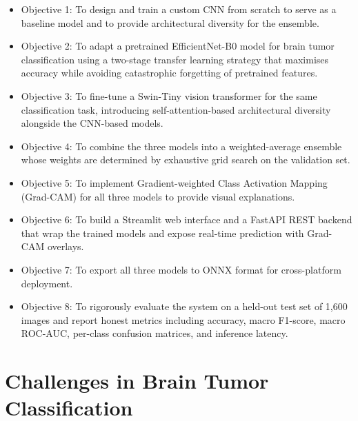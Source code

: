 \documentclass[12pt,a4paper,oneside]{report}
\begin{document}
\begin{itemize}[leftmargin=*]
  \item Objective 1: To design and train a custom CNN from scratch to serve as a baseline model and to provide architectural diversity for the ensemble.
  \item Objective 2: To adapt a pretrained EfficientNet-B0 model for brain tumor classification using a two-stage transfer learning strategy that maximises accuracy while avoiding catastrophic forgetting of pretrained features.
  \item Objective 3: To fine-tune a Swin-Tiny vision transformer for the same classification task, introducing self-attention-based architectural diversity alongside the CNN-based models.
  \item Objective 4: To combine the three models into a weighted-average ensemble whose weights are determined by exhaustive grid search on the validation set.
  \item Objective 5: To implement Gradient-weighted Class Activation Mapping (Grad-CAM) for all three models to provide visual explanations.
  \item Objective 6: To build a Streamlit web interface and a FastAPI REST backend that wrap the trained models and expose real-time prediction with Grad-CAM overlays.
  \item Objective 7: To export all three models to ONNX format for cross-platform deployment.
  \item Objective 8: To rigorously evaluate the system on a held-out test set of 1,600 images and report honest metrics including accuracy, macro F1-score, macro ROC-AUC, per-class confusion matrices, and inference latency.
\end{itemize}

\section{Challenges in Brain Tumor Classification}
\end{document}

